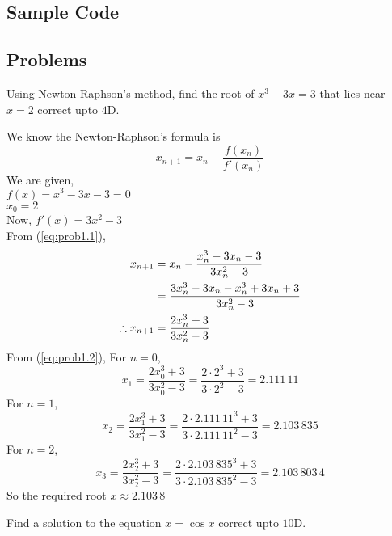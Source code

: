 \documentclass[12pt,class=book,crop=false]{standalone}
\begin{document}
\subsection{Sample Code}

\newpage
\subsection{Problems}
\begin{prob}
    Using Newton-Raphson's method, find the root of \( x^3-3x=3 \) that lies near \( x=2 \) correct upto \( 4 \)D.
\end{prob}
\begin{soln}
    We know the Newton-Raphson's formula is
    \begin{equation}
        x_{n+1}=x_n-\frac{f(x_n)}{f'(x_n)} \label{eq:prob1.1}
    \end{equation}
    We are given,\\
    \indent \( f(x)=x^3-3x-3=0 \)\\
    \indent \( x_0=2 \)\\
    Now, \( f'(x)=3x^2-3 \)\\
    From (\ref{eq:prob1.1}),
    \begin{align}
        x_{n+1}            & =x_n-\frac{x_n^3-3x_n-3}{3x_n^2-3}\notag         \\
                           & =\frac{3x_n^3-3x_n-x_n^3+3x_n+3}{3x_n^2-3}\notag \\
        \therefore x_{n+1} & =\frac{2x_n^3+3}{3x_n^2-3}\label{eq:prob1.2}
    \end{align}
    From (\ref{eq:prob1.2}), For \( n=0 \),
    \[
        x_1=\frac{2x_0^3+3}{3x_0^2-3}=\frac{2\cdot{2}^3+3}{3\cdot{2}^2-3}=2.111\,11
    \]
    For \( n=1 \),
    \[
        x_2=\frac{2x_1^3+3}{3x_1^2-3}=\frac{2\cdot{2.111\,11}^3+3}{3\cdot{2.111\,11}^2-3}=2.103\,835
    \]
    For \( n=2 \),
    \[
        x_3=\frac{2x_2^3+3}{3x_2^2-3}=\frac{2\cdot{2.103\,835}^3+3}{3\cdot{2.103\,835}^2-3}=2.103\,803\,4
    \]
    So the required root \( x\approx 2.103\,8 \)
\end{soln}
\begin{prob}
    Find a solution to the equation \( x=\cos x \) correct upto \( 10 \)D.
\end{prob}
\end{document}

